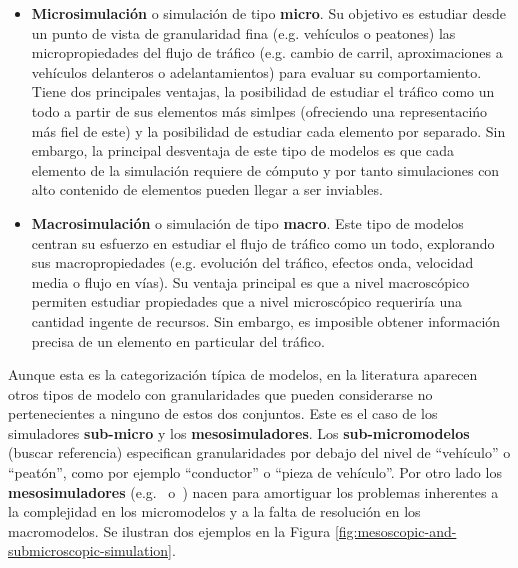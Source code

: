 \begin{itemize}
	\item \textbf{Microsimulación} o simulación de tipo \textbf{micro}. Su objetivo es estudiar desde un punto de vista de granularidad fina (e.g. vehículos o peatones) las micropropiedades del flujo de tráfico (e.g. cambio de carril, aproximaciones a vehículos delanteros o adelantamientos) para evaluar su comportamiento. Tiene dos principales ventajas, la posibilidad de estudiar el tráfico como un todo a partir de sus elementos más simlpes (ofreciendo una representacińo más fiel de este) y la posibilidad de estudiar cada elemento por separado. Sin embargo, la principal desventaja de este tipo de modelos es que cada elemento de la simulación requiere de cómputo y por tanto simulaciones con alto contenido de elementos pueden llegar a ser inviables.
	\item \textbf{Macrosimulación} o simulación de tipo \textbf{macro}. Este tipo de modelos centran su esfuerzo en estudiar el flujo de tráfico como un todo, explorando sus macropropiedades (e.g. evolución del tráfico, efectos onda, velocidad media o flujo en vías). Su ventaja principal es que a nivel macroscópico permiten estudiar propiedades que a nivel microscópico requeriría una cantidad ingente de recursos. Sin embargo, es imposible obtener información precisa de un elemento en particular del tráfico.
\end{itemize}

Aunque esta es la categorización típica de modelos, en la literatura aparecen otros tipos de modelo con granularidades que pueden considerarse no pertenecientes a ninguno de estos dos conjuntos. Este es el caso de los simuladores \textbf{sub-micro} y los \textbf{mesosimuladores}. Los \textbf{sub-micromodelos} (\TODO buscar referencia) especifican granularidades por debajo del nivel de \enquote{vehículo} o \enquote{peatón}, como por ejemplo \enquote{conductor} o \enquote{pieza de vehículo}. Por otro lado los \textbf{mesosimuladores} (e.g.~\cite{munoz2001integrated} o~\cite{casas2011need}) nacen para amortiguar los problemas inherentes a la complejidad en los micromodelos y a la falta de resolución en los macromodelos. Se ilustran dos ejemplos en la Figura \ref{fig:mesoscopic-and-submicroscopic-simulation}.

